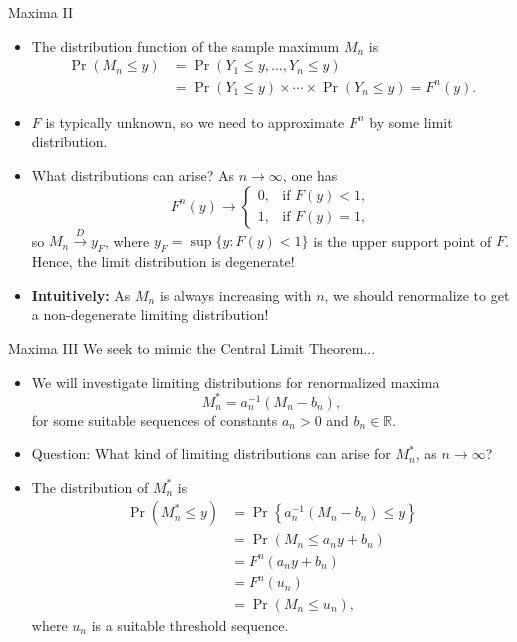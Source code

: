 \documentclass[10pt, hyperref={colorlinks = true,linkcolor = blue}]{beamer}
\begin{document}
{{\begin{frame}{Maxima II}
\begin{itemize}
    \item The distribution function of the sample maximum $M_n$ is
\begin{align*}
    \Pr(M_n \leq y) &= \Pr(Y_1 \leq y, \ldots, Y_n \leq y) \\ &=  \Pr(Y_1 \leq y) \times \cdots \times \Pr(Y_n \leq y) = F^n(y).
  \end{align*}
    \item $F$ is typically unknown, so we need to approximate $F^n$ by some limit distribution.
    \item What distributions can arise? As $n \to \infty$, one has
    \[
    F^n(y) \to
    \begin{cases}
        0, & \text{if } F(y) < 1, \\
        1, & \text{if } F(y) = 1,
    \end{cases}
    \]
    so $M_n \xrightarrow{D} y_F$, where $y_F = \sup\{y : F(y) < 1\}$ is the upper support point of $F$. Hence, the limit distribution is degenerate!
    \item \textbf{Intuitively:} As $M_n$ is always increasing with $n$, we should renormalize to get a non-degenerate limiting distribution!
\end{itemize}
\end{frame}

\begin{frame}{Maxima III}
We seek to mimic the Central Limit Theorem...
 \begin{itemize}
    \item We will investigate limiting distributions for renormalized maxima
    \[
    M^*_n = a_n^{-1} (M_n - b_n),
    \]
    for some suitable sequences of constants $a_n > 0$ and $b_n \in \mathbb{R}$.
    \item Question: What kind of limiting distributions can arise for $M^*_n$, as $n \to \infty$?
    \item The distribution of $M^*_n$ is
    \begin{align*}
    \Pr(M^*_n \leq y) &= \Pr\left\{a_n^{-1} (M_n - b_n) \leq y\right\} \\
    &= \Pr(M_n \leq a_n y + b_n) \\
    &= F^n(a_n y + b_n) \\
    &= F^n(u_n) \\ &= \Pr(M_n \leq u_n),
 \end{align*}
    where $u_n$ is a suitable threshold sequence.
\end{itemize}
\end{frame}


}}
\end{document}
